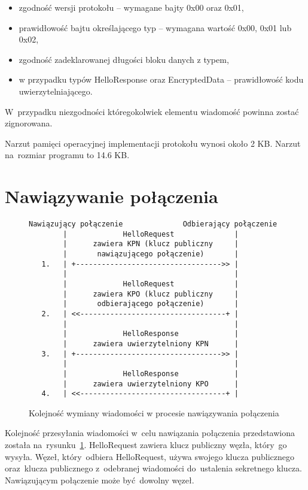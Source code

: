\begin{itemize}
\item zgodność wersji protokołu -- wymagane bajty 0x00 oraz 0x01,
\item prawidłowość bajtu określającego typ -- wymagana wartość 0x00, 0x01 lub 0x02,
\item zgodność zadeklarowanej długości bloku danych z typem,
\item w przypadku typów HelloResponse oraz EncryptedData -- prawidłowość kodu uwierzytelniającego.
\end{itemize}

W~przypadku niezgodności któregokolwiek elementu wiadomość powinna zostać zignorowana.

Narzut pamięci operacyjnej implementacji protokołu wynosi około 2 KB. Narzut na~rozmiar programu to 14.6 KB.

\section{Nawiązywanie połączenia}

\begin{figure}[ht]
\centering
\begin{BVerbatim}
Nawiązujący połączenie              Odbierający połączenie
        |             HelloRequest              |
        |      zawiera KPN (klucz publiczny     |
        |       nawiązującego połączenie)       |
   1.   | +---------------------------------->> |
        |                                       |
        |             HelloRequest              |
        |      zawiera KPO (klucz publiczny     |
        |       odbierającego połączenie)       |
   2.   | <<----------------------------------+ |
        |                                       |
        |             HelloResponse             |
        |      zawiera uwierzytelniony KPN      |
   3.   | +---------------------------------->> |
        |                                       |
        |             HelloResponse             |
        |      zawiera uwierzytelniony KPO      |
   4.   | <<----------------------------------+ |
\end{BVerbatim}
\caption{Kolejność wymiany wiadomości w procesie nawiązywania połączenia}
\label{fig:handshake}
\end{figure}

Kolejność przesyłania wiadomości w~celu nawiązania połączenia przedstawiona została na~rysunku~\ref{fig:handshake}. HelloRequest zawiera klucz publiczny węzła, który~go wysyła. Węzeł, który~odbiera HelloRequest, używa swojego klucza publicznego oraz~klucza publicznego z~odebranej wiadomości do~ustalenia sekretnego klucza. Nawiązującym połączenie może być dowolny węzeł.

